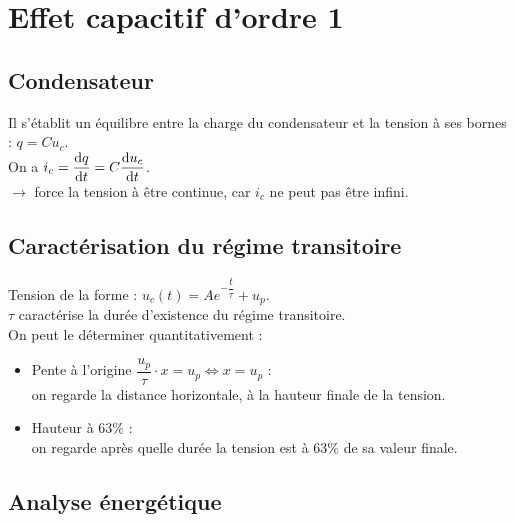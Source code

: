 \documentclass[13pt, twoside, a4paper, french]{report}
\begin{document}
        
        \section{Effet capacitif d'ordre 1}\label{sec:effet-capacitif-d'ordre-1}
            
            \subsection{Condensateur}\label{subsec:condensateur}
                
                Il s'établit un équilibre entre la charge du condensateur et la tension à ses bornes : $q = C u_c$.\\
                
                On a $i_c = \dfrac{\textrm d q}{\textrm d t} = C \dfrac{\textrm d u_c}{\textrm d t}$.\\
                $\rightarrow$ force la tension à être continue, car $i_c$ ne peut pas être infini.\\
            
            \subsection{Caractérisation du régime transitoire}\label{subsec:caracterisation-du-regime-transitoire}
                
                Tension de la forme : $u_c(t) = A e^{-\dfrac{t}{\tau}} + u_p$.\\
                
                $\tau$ caractérise la durée d'existence du régime transitoire.\\
                On peut le déterminer quantitativement :
                \begin{itemize}
                    \item Pente à l'origine $\dfrac{u_p}{\tau} \cdot x = u_p \iff x = u_p$ :\\
                    on regarde la distance horizontale, à la hauteur finale de la tension.
                    \item Hauteur à $63\%$ :\\
                    on regarde après quelle durée la tension est à $63\%$ de sa valeur finale.
                \end{itemize}
            
            \subsection{Analyse énergétique}\label{subsec:analyse-energetique}
                
\end{document}
